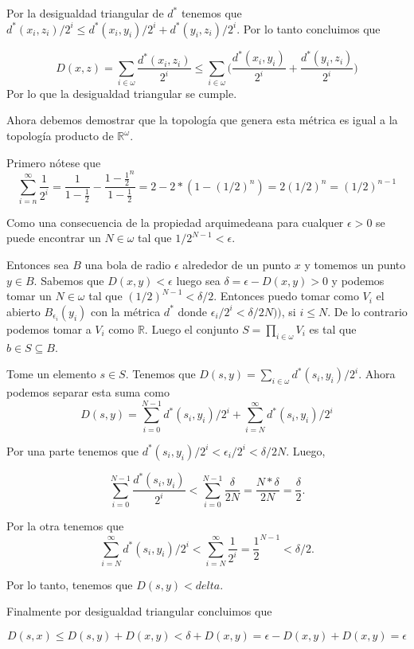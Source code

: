 \documentclass[letter,twoside,12pt]{article}
\begin{document}
\begin{enumerate}
Por la desigualdad triangular de $ d^* $ tenemos que $ d^*(x_i,z_i)/2^i \leq d^*(x_i,y_i)/2^i+d^*(y_i,z_i)/2^i $. Por lo tanto concluimos que

\begin{equation}
D(x,z)=\sum_{i \in \omega} \frac{d^*(x_i,z_i)}{2^i} \leq \sum_{i \in \omega} \Big(\frac{d^*(x_i,y_i)}{2^i}+\frac{d^*(y_i,z_i)}{2^i}\Big) \nonumber
\end{equation}
Por lo que la desigualdad triangular se cumple.

Ahora debemos demostrar que la topología que genera esta métrica es igual a la topología producto de $ \mathbb{R}^\omega $.

Primero nótese que 
\begin{equation}
\sum_{i =n}^{\infty} \frac{1}{2^i} = \frac{1}{1-\frac{1}{2}}-\frac{1-\frac{1}{2}^n}{1-\frac{1}{2}}= 2-2*(1-(1/2)^n)=2(1/2)^n=(1/2)^{n-1} \nonumber
\end{equation}

Como una consecuencia de la propiedad arquimedeana para cualquer $ \epsilon > 0 $ se puede encontrar un $ N \in \omega $ tal que $ 1/2^{N-1} < \epsilon$.

Entonces sea $ B $ una bola de radio $ \epsilon $ alrededor de un punto $ x $ y tomemos un punto $ y \in B $. Sabemos que $ D(x,y)<\epsilon $ luego sea $ \delta = \epsilon-D(x,y)>0 $ y podemos tomar un $N \in \omega$ tal que $ (1/2)^{N-1} <\delta/2$. Entonces puedo tomar como $ V_i $ el abierto $ B_{\epsilon_i}(y_i)$ con la métrica $ d^* $ donde  $\epsilon_i/2^i<\delta/2N))$, si $ i \leq N $. De lo contrario podemos tomar a $ V_i $ como $ \mathbb{R} $. Luego el conjunto $ S = \prod_{i \in \omega} V_i$ es tal que $ b \in S \subseteq B $. 

Tome un elemento $ s \in S $. Tenemos que $ D(s,y) = \sum_{i \in \omega}d^*(s_i,y_i)/2^i$. Ahora podemos separar esta suma como
\begin{equation}
D(s,y) = \sum_{i=0}^{N-1}d^*(s_i,y_i)/2^i +  \sum_{i=N}^{\infty}d^*(s_i,y_i)/2^i \nonumber
\end{equation}

Por una parte tenemos que $ d^*(s_i,y_i)/2^i < \epsilon_i/2^i<\delta/2N$. Luego,

\begin{equation}
\sum_{i=0}^{N-1}\frac{d^*(s_i,y_i)}{2^i} < \sum_{i=0}^{N-1} \frac{\delta}{2N} = \frac{N*\delta}{2N} = \frac{\delta}{2}. \nonumber
\end{equation}

Por la otra tenemos que
\begin{equation}
\sum_{i=N}^{\infty}d^*(s_i,y_i)/2^i < \sum_{i=N}^{\infty}\frac{1}{2^i}=\frac{1}{2}^{N-1}<\delta/2. \nonumber
\end{equation}

Por lo tanto, tenemos que $ D(s,y)<delta $.

Finalmente por desigualdad triangular concluimos que

\begin{equation}
D(s,x) \leq D(s,y)+D(x,y) < \delta+D(x,y)=\epsilon-D(x,y)+D(x,y) =\epsilon\nonumber
\end{equation}




\end{enumerate}
\end{document}
